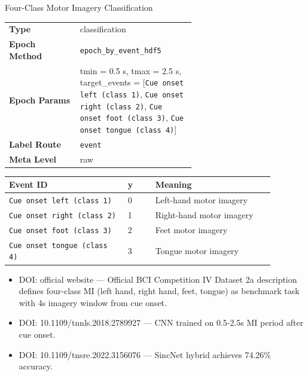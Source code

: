 {\begin{tcolorbox}
 {\footnotesize Four-Class Motor Imagery Classification}\par\smallskip
{\footnotesize\begin{tabular}{@{}lp{0.62\linewidth}@{}}
\textbf{Type} & classification \\
\textbf{Epoch Method} & \texttt{epoch\_by\_event\_hdf5} \\
\textbf{Epoch Params} & tmin = 0.5 s, tmax = 2.5 s, target\_events = [\texttt{Cue onset left (class 1)}, \texttt{Cue onset right (class 2)}, \texttt{Cue onset foot (class 3)}, \texttt{Cue onset tongue (class 4)}] \\
\textbf{Label Route} & \texttt{event} \\
\textbf{Meta Level} & raw \\
\end{tabular}}
\par{}\par\smallskip
\begingroup\footnotesize
\begin{tabular}{@{}p{0.3911\linewidth}p{0.0978\linewidth}p{0.3911\linewidth}@{}}
\toprule
\textbf{Event ID} & \textbf{y} & \textbf{Meaning} \\
\midrule
\texttt{Cue onset left (class 1)} & 0 & Left-hand motor imagery \\
\texttt{Cue onset right (class 2)} & 1 & Right-hand motor imagery \\
\texttt{Cue onset foot (class 3)} & 2 & Feet motor imagery \\
\texttt{Cue onset tongue (class 4)} & 3 & Tongue motor imagery \\
\bottomrule
\end{tabular}
\endgroup
\par{}\par
\begin{itemize}[leftmargin=1.3em,noitemsep,topsep=1pt]
\item[\scriptsize$\cdot$] {\scriptsize DOI: official website --- Official BCI Competition IV Dataset 2a description defines four-class MI (left hand, right hand, feet, tongue) as benchmark task with 4s imagery window from cue onset.}
\item[\scriptsize$\cdot$] {\scriptsize DOI: 10.1109/tnnls.2018.2789927 --- CNN trained on 0.5-2.5s MI period after cue onset.}
\item[\scriptsize$\cdot$] {\scriptsize DOI: 10.1109/tnsre.2022.3156076 --- SincNet hybrid achieves 74.26\% accuracy.}

\end{itemize}
\end{tcolorbox}}
